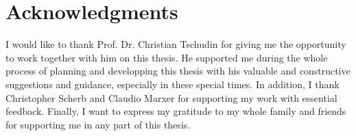 \chapter{Acknowledgments}
I would like to thank Prof. Dr. Christian Tschudin for giving me the opportunity to work together with him on this thesis. He supported me during the whole process of planning and developping this thesis with his valuable and constructive suggestions and guidance, especially in these special times. In addition, I thank Christopher Scherb and Claudio Marxer for supporting my work with essential feedback. Finally, I want to express my gratitude to my whole family and friends for supporting me in any part of this thesis.
